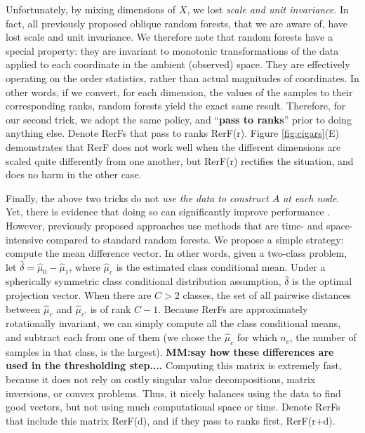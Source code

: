 \documentclass{article} %
\providecommand{\mh}[1]{\hat{#1}}
\begin{document}
Unfortunately, by mixing dimensions of $X$, we lost {\em{scale and unit invariance}}.  In fact, all previously proposed oblique random forests, that we are aware of, have lost scale and unit invariance.  We therefore note that random forests have a special property: they are invariant to monotonic transformations of the data applied to each coordinate in the ambient (observed) space.  They are effectively operating on the order statistics, rather than actual magnitudes of coordinates.  In other words, if we convert, for each dimension, the values of the samples to their corresponding ranks, random forests yield the exact same result. Therefore, for our second trick, we adopt the same policy, and ``{\bf{pass to ranks}}'' prior to doing anything else. Denote RerFs that pass to ranks RerF(r).
Figure \ref{fig:cigars}(E) demonstrates that RerF does not work well when the different dimensions are scaled quite differently from one another, but RerF(r) rectifies the situation, and does no harm in the other case. 

Finally, the above two tricks do not {\em{use the data to construct $A$ at each node}}.  Yet, there is  evidence that doing so can significantly improve performance \cite{Heath1993}.  However, previously proposed approaches use methods that are time- and space-intensive compared to standard random forests.  We propose a simple strategy: compute the mean difference vector.  In other words, given a two-class problem, let $\mh{\delta}=\mh{\mu}_0-\mh{\mu}_1$, where $\mh{\mu}_c$ is the estimated class conditional mean.  Under a spherically symmetric class conditional distribution assumption, $\mh{\delta}$ is the optimal projection vector.  When there are $C>2$ classes, the set of all pairwise distances between $\mh{\mu}_c$ and $\mh{\mu}_{c'}$ is of rank $C-1$.  Because RerFs are approximately rotationally invariant, we can simply compute all the class conditional means, and subtract each from one of them (we chose the $\mh{\mu}_c$ for which $n_c$, the number of samples in that class, is the largest). {\bf{MM:say how these differences are used in the thresholding step....}}
Computing this matrix is extremely fast, because it does not rely on costly singular value decompositions, matrix inversions, or convex problems.  Thus, it nicely balances using the data to find good vectors, but not using much computational space or time. Denote RerFs that include this matrix RerF(d), and if they pass to ranks first, RerF(r+d).
\end{document}
